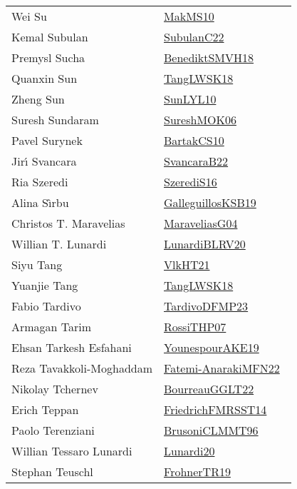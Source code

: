 {\begin{longtable}{p{4cm}p{20cm}}
Wei Su & \href{works/MakMS10.pdf}{MakMS10}~\cite{MakMS10}\\
Kemal Subulan & \href{works/SubulanC22.pdf}{SubulanC22}~\cite{SubulanC22}\\
Premysl Sucha & \href{works/BenediktSMVH18.pdf}{BenediktSMVH18}~\cite{BenediktSMVH18}\\
Quanxin Sun & \href{}{TangLWSK18}~\cite{TangLWSK18}\\
Zheng Sun & \href{works/SunLYL10.pdf}{SunLYL10}~\cite{SunLYL10}\\
Suresh Sundaram & \href{}{SureshMOK06}~\cite{SureshMOK06}\\
Pavel Surynek & \href{works/BartakCS10.pdf}{BartakCS10}~\cite{BartakCS10}\\
Jir{\'{\i}} Svancara & \href{}{SvancaraB22}~\cite{SvancaraB22}\\
Ria Szeredi & \href{works/SzerediS16.pdf}{SzerediS16}~\cite{SzerediS16}\\
Alina S{\^{\i}}rbu & \href{works/GalleguillosKSB19.pdf}{GalleguillosKSB19}~\cite{GalleguillosKSB19}\\
Christos T. Maravelias & \href{works/MaraveliasG04.pdf}{MaraveliasG04}~\cite{MaraveliasG04}\\
Willian T. Lunardi & \href{works/LunardiBLRV20.pdf}{LunardiBLRV20}~\cite{LunardiBLRV20}\\
Siyu Tang & \href{works/VlkHT21.pdf}{VlkHT21}~\cite{VlkHT21}\\
Yuanjie Tang & \href{}{TangLWSK18}~\cite{TangLWSK18}\\
Fabio Tardivo & \href{works/TardivoDFMP23.pdf}{TardivoDFMP23}~\cite{TardivoDFMP23}\\
Armagan Tarim & \href{works/RossiTHP07.pdf}{RossiTHP07}~\cite{RossiTHP07}\\
Ehsan Tarkesh Esfahani & \href{}{YounespourAKE19}~\cite{YounespourAKE19}\\
Reza Tavakkoli-Moghaddam & \href{}{Fatemi-AnarakiMFN22}~\cite{Fatemi-AnarakiMFN22}\\
Nikolay Tchernev & \href{works/BourreauGGLT22.pdf}{BourreauGGLT22}~\cite{BourreauGGLT22}\\
Erich Teppan & \href{}{FriedrichFMRSST14}~\cite{FriedrichFMRSST14}\\
Paolo Terenziani & \href{works/BrusoniCLMMT96.pdf}{BrusoniCLMMT96}~\cite{BrusoniCLMMT96}\\
Willian Tessaro Lunardi & \href{}{Lunardi20}~\cite{Lunardi20}\\
Stephan Teuschl & \href{works/FrohnerTR19.pdf}{FrohnerTR19}~\cite{FrohnerTR19}\\

\end{longtable}}

